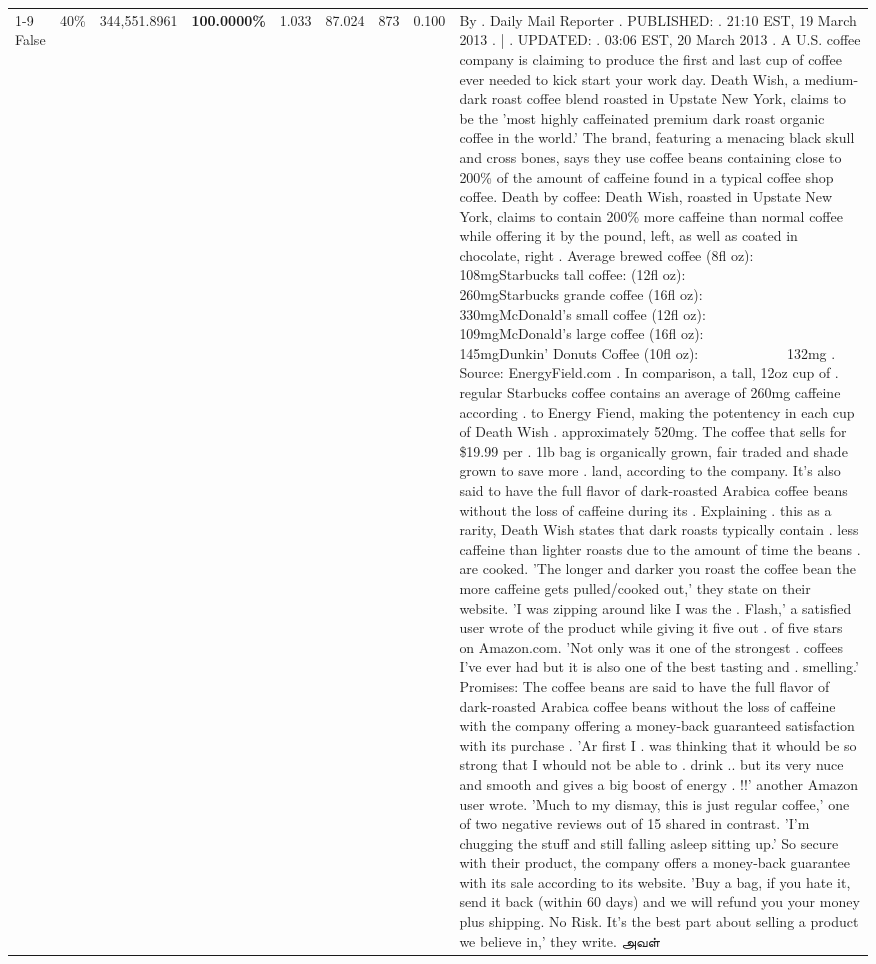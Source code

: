 \begin{table}[H]
{\begin{tabular}{lllrlllll}
\cline{1-9} \cline{2-9}
False & 40\% & 344,551.8961 & \bfseries \color{red} 100.0000\% & 1.033 & 87.024 & 873 & 0.100 & By . Daily Mail Reporter . PUBLISHED: . 21:10 EST, 19 March 2013 . | . UPDATED: . 03:06 EST, 20 March 2013 . A U.S. coffee company is claiming to produce the first and last cup of coffee ever needed to kick start your work day. Death Wish, a medium-dark roast coffee blend roasted in Upstate New York, claims to be the 'most highly caffeinated premium dark roast organic coffee in the world.' The brand, featuring a menacing black skull and cross bones, says they use coffee beans containing close to 200\% of the amount of caffeine found in a typical coffee shop coffee. Death by coffee: Death Wish, roasted in Upstate New York, claims to contain 200\% more caffeine than normal coffee while offering it by the pound, left, as well as coated in chocolate, right . Average brewed coffee (8fl oz):              108mgStarbucks tall coffee: (12fl oz):                260mgStarbucks grande coffee (16fl oz):         330mgMcDonald's small coffee (12fl oz):           109mgMcDonald's large coffee (16fl oz):           145mgDunkin' Donuts Coffee (10fl oz):             132mg . Source: EnergyField.com . In comparison, a tall, 12oz cup of . regular Starbucks coffee contains an average of 260mg caffeine according . to Energy Fiend, making the potentency in each cup of Death Wish . approximately 520mg. The coffee that sells for \$19.99 per . 1lb bag is organically grown, fair traded and shade grown to save more . land, according to the company. It's also said to have the full flavor of dark-roasted Arabica coffee beans without the loss of caffeine during its . Explaining . this as a rarity, Death Wish states that dark roasts typically contain . less caffeine than lighter roasts due to the amount of time the beans . are cooked. 'The longer and darker you roast the coffee bean the more caffeine gets pulled/cooked out,' they state on their website. 'I was zipping around like I was the . Flash,' a satisfied user wrote of the product while giving it five out . of five stars on Amazon.com. 'Not only was it one of the strongest . coffees I've ever had but it is also one of the best tasting and . smelling.’ Promises: The coffee beans are said to have the full flavor of dark-roasted Arabica coffee beans without the loss of caffeine with the company offering a money-back guaranteed satisfaction with its purchase . 'Ar first I . was thinking that it whould be so strong that I whould not be able to . drink .. but its very nuce and smooth and gives a big boost of energy . !!' another Amazon user wrote. 'Much to my dismay, this is just regular coffee,' one of two negative reviews out of 15 shared in contrast. 'I'm chugging the stuff and still falling asleep sitting up.' So secure with their product, the company offers a money-back guarantee with its sale according to its website. 'Buy a bag, if you hate it, send it back (within 60 days) and we will refund you your money plus shipping. No Risk. It’s the best part about selling a product we believe in,' they write. அவள் \\

\end{tabular}}
\end{table}
